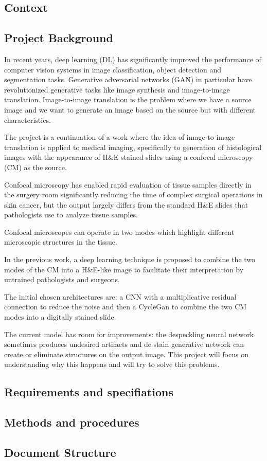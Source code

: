 \documentclass[../main.tex]{subfiles}
\begin{document}
\subsection{Context}
\label{sec:context}
\lipsum

\subsection{Project Background}
\label{sec:project-background}

In recent years, deep learning (DL) has significantly improved the
performance of computer vision systems in image classification, object
detection and segmentation tasks. Generative adversarial networks (GAN)
in particular have revolutionized generative tasks like image synthesis
and image-to-image translation. Image-to-image translation is the
problem where we have a source image and we want to generate an image
based on the source but with different characteristics.

The project is a continuation of a work \cite{Combalia2019} where the idea of
image-to-image translation is applied to medical imaging, specifically
to generation of histological images with the appearance of H\&E stained
slides using a confocal microscopy (CM) as the source.

Confocal microscopy has enabled rapid evaluation of tissue samples
directly in the surgery room significantly reducing the time of complex
surgical operations in skin cancer, but the output largely differs from
the standard H\&E slides that pathologists use to analyze tissue
samples.

Confocal microscopes can operate in two modes which highlight different
microscopic structures in the tissue.

In the previous work, a deep learning technique is proposed to combine
the two modes of the CM into a H\&E-like image to facilitate their
interpretation by untrained pathologists and surgeons.

The initial chosen architectures are: a CNN with a multiplicative
residual connection to reduce the noise and then a CycleGan to combine
the two CM modes into a digitally stained slide.

The current model has room for improvements: the despeckling neural
network sometimes produces undesired artifacts and de stain generative
network can create or eliminate structures on the output image. This
project will focus on understanding why this happens and will try to
solve this problems.

\subsection{Requirements and specifiations}
\label{sec:requirements-and-specifiations}
\lipsum

\subsection{Methods and procedures}
\label{sec:methods-and-procedures}
\lipsum

\subsection{Document Structure}
\lipsum

\printbibliography
\end{document}
